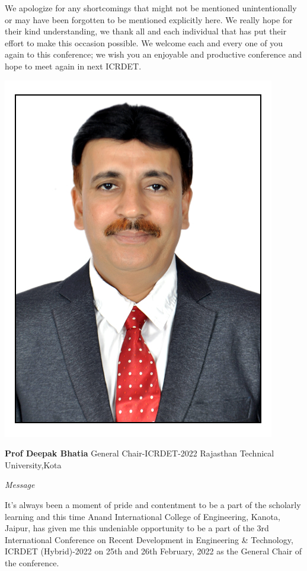 \documentclass[twoside,11pt]{amsart}
\begin{document}
We apologize for any shortcomings that might not be mentioned unintentionally or may have been forgotten to be mentioned explicitly here. We really hope for their kind understanding, we thank all and each individual that has put their effort to make this occasion possible.
We welcome each and every one of you again to this conference; we wish you an enjoyable and productive conference and hope to meet again in next ICRDET. 
\vskip 5mm
\newpage
\vskip 1mm
\begin{flushright}
\includegraphics[height=8\baselineskip]{Deepak Bhatia}
\end{flushright}
\vskip 1mm
\hfill \textbf{ Prof Deepak Bhatia}
\vskip 1mm
\hfill General Chair-ICRDET-2022
\vskip 1mm
\hfill  Rajasthan Technical University,Kota
\vskip 10mm
\centerline {\huge{\emph{Message}}}
\vskip 10mm
It’s always been a moment of pride and contentment to be a part of the scholarly learning and this time Anand International College of Engineering, Kanota, Jaipur, has given me this undeniable opportunity to be a part of the 3rd International Conference on Recent Development in Engineering \& Technology, ICRDET (Hybrid)-2022 on 25th and 26th February, 2022 as the General Chair of the conference.
\end{document}
